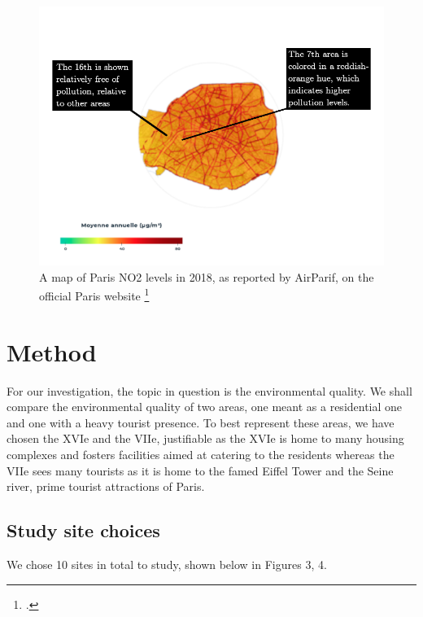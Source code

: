 \documentclass[11pt,letterpaper]{article}
\begin{document}
\begin{figure}[h!]
    \begin{minipage}{\textwidth}
    \centering
    \includegraphics[width=0.7\linewidth]{no2_map.png}
    \caption{A map of Paris NO2 levels in 2018, as reported by AirParif, on the official Paris website \protect\footcite{paris_air_qual}}
    \end{minipage}
\end{figure}



\section{Method}


For our investigation, the topic in question is the environmental quality. We shall compare the environmental quality of two areas, one meant as a residential one and one with a heavy tourist presence. To best represent these areas, we have chosen the XVIe and the VIIe, justifiable as the XVIe is home to many housing complexes and fosters facilities aimed at catering to the residents whereas the VIIe sees many tourists as it is home to the famed Eiffel Tower and the Seine river, prime tourist attractions of Paris.

\subsection{Study site choices}

We chose 10 sites in total to study, shown below in Figures 3, 4. 
\end{document}
